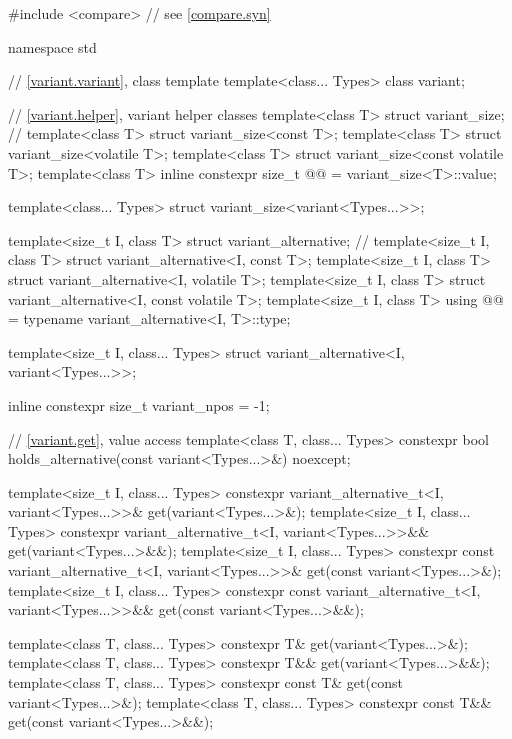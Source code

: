 \begin{codeblock}
#include <compare>              // see \ref{compare.syn}

namespace std {
  // \ref{variant.variant}, class template 
  template<class... Types>
    class variant;

  // \ref{variant.helper}, variant helper classes
  template<class T> struct variant_size;                        // \notdef
  template<class T> struct variant_size<const T>;
  template<class T> struct variant_size<volatile T>;
  template<class T> struct variant_size<const volatile T>;
  template<class T>
    inline constexpr size_t @@ = variant_size<T>::value;

  template<class... Types>
    struct variant_size<variant<Types...>>;

  template<size_t I, class T> struct variant_alternative;       // \notdef
  template<size_t I, class T> struct variant_alternative<I, const T>;
  template<size_t I, class T> struct variant_alternative<I, volatile T>;
  template<size_t I, class T> struct variant_alternative<I, const volatile T>;
  template<size_t I, class T>
    using @@ = typename variant_alternative<I, T>::type;

  template<size_t I, class... Types>
    struct variant_alternative<I, variant<Types...>>;

  inline constexpr size_t variant_npos = -1;

  // \ref{variant.get}, value access
  template<class T, class... Types>
    constexpr bool holds_alternative(const variant<Types...>&) noexcept;

  template<size_t I, class... Types>
    constexpr variant_alternative_t<I, variant<Types...>>& get(variant<Types...>&);
  template<size_t I, class... Types>
    constexpr variant_alternative_t<I, variant<Types...>>&& get(variant<Types...>&&);
  template<size_t I, class... Types>
    constexpr const variant_alternative_t<I, variant<Types...>>& get(const variant<Types...>&);
  template<size_t I, class... Types>
    constexpr const variant_alternative_t<I, variant<Types...>>&& get(const variant<Types...>&&);

  template<class T, class... Types>
    constexpr T& get(variant<Types...>&);
  template<class T, class... Types>
    constexpr T&& get(variant<Types...>&&);
  template<class T, class... Types>
    constexpr const T& get(const variant<Types...>&);
  template<class T, class... Types>
    constexpr const T&& get(const variant<Types...>&&);

}
\end{codeblock}
